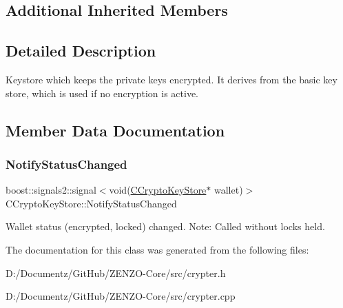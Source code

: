 \subsection*{Additional Inherited Members}


\subsection{Detailed Description}
Keystore which keeps the private keys encrypted. It derives from the basic key store, which is used if no encryption is active. 

\subsection{Member Data Documentation}
\mbox{\label{class_c_crypto_key_store_aeeb1c466663df6be9be54b1833e0f888}} 
\subsubsection{\texorpdfstring{NotifyStatusChanged}{NotifyStatusChanged}}
{\footnotesize\ttfamily boost\+::signals2\+::signal$<$void(\mbox{\hyperlink{class_c_crypto_key_store}{C\+Crypto\+Key\+Store}}$\ast$ wallet)$>$ C\+Crypto\+Key\+Store\+::\+Notify\+Status\+Changed}

Wallet status (encrypted, locked) changed. Note\+: Called without locks held. 

The documentation for this class was generated from the following files\+:\begin{DoxyCompactItemize}
\item 
D\+:/\+Documentz/\+Git\+Hub/\+Z\+E\+N\+Z\+O-\/\+Core/src/crypter.\+h\item 
D\+:/\+Documentz/\+Git\+Hub/\+Z\+E\+N\+Z\+O-\/\+Core/src/crypter.\+cpp\end{DoxyCompactItemize}
